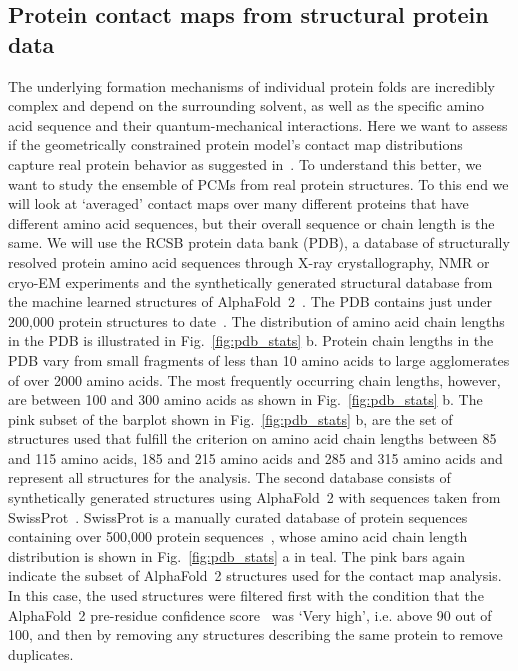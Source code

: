 \documentclass[
reprint,
twocolumn,
amsmath,amssymb,superscriptaddress,aps,
pre]{revtex4-1}
\begin{document}
\subsection{Protein contact maps from structural protein data}

The underlying formation mechanisms of individual protein folds are incredibly complex and depend on the surrounding solvent, as well as the specific amino acid sequence and their quantum-mechanical interactions. Here we want to assess if the geometrically constrained protein model's contact map distributions capture real protein behavior as suggested in~\cite{bartoli2008effecta}. To understand this better, we want to study the ensemble of PCMs from real protein structures. To this end we will look at `averaged' contact maps over many different proteins that have different amino acid sequences, but their overall sequence or chain length is the same. 
We will use the RCSB protein data bank (PDB), a database of structurally resolved protein amino acid sequences through X-ray crystallography, NMR or cryo-EM experiments and the synthetically generated structural database from the machine learned structures of AlphaFold~2~\cite{jumper2021highly}. The PDB contains just under 200,000 protein structures to date~\cite{PDB}. The distribution of amino acid chain lengths in the PDB is illustrated in Fig.~\ref{fig:pdb_stats} b. Protein chain lengths in the PDB vary from small fragments of less than 10 amino acids to large agglomerates of over 2000 amino acids. The most frequently occurring chain lengths, however, are between 100 and 300 amino acids as shown in Fig.~\ref{fig:pdb_stats} b. The pink subset of the barplot shown in Fig.~\ref{fig:pdb_stats} b, are the set of structures used that fulfill the criterion on amino acid chain lengths between 85 and 115 amino acids, 185 and 215 amino acids and 285 and 315 amino acids and represent all structures for the analysis. The second database consists of synthetically generated structures using AlphaFold~2 with sequences taken from SwissProt~\cite{alpha fold 2 database}. SwissProt is a manually curated database of protein sequences containing over 500,000 protein sequences~\cite{SwissProt}, whose amino acid chain length distribution is shown in Fig.~\ref{fig:pdb_stats} a in teal. The pink bars again indicate the subset of AlphaFold~2 structures used for the contact map analysis. In this case, the used structures were filtered first with the condition that the AlphaFold~2 pre-residue confidence score~\cite{jumper2021highly} was `Very high', i.e. above 90 out of 100, and then by removing any structures describing the same protein to remove duplicates.
\end{document}
